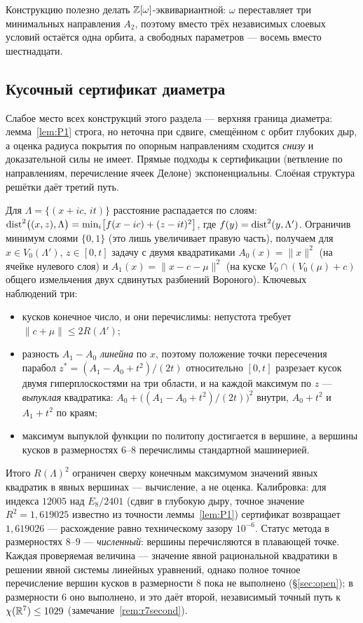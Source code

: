 Конструкцию полезно делать $\mathbb{Z}[\omega]$-эквивариантной: $\omega$ переставляет три
минимальных направления $A_2$, поэтому вместо трёх независимых слоевых условий
остаётся одна орбита, а свободных параметров --- восемь вместо шестнадцати.

\subsection{Кусочный сертификат диаметра}\label{ssec:cert}

Слабое место всех конструкций этого раздела --- верхняя граница диаметра:
лемма~\ref{lem:P1} строга, но неточна при сдвиге, смещённом с орбит глубоких
дыр, а оценка радиуса покрытия по опорным направлениям сходится \emph{снизу}
и доказательной силы не имеет. Прямые подходы к сертификации (ветвление по
направлениям, перечисление ячеек Делоне) экспоненциальны. Слоёная структура
решётки даёт третий путь.

Для $\Lambda=\{(x+ic,\,it)\}$ расстояние распадается по слоям:
$\operatorname{dist}^2\bigl((x,z),\Lambda\bigr)=\min_i\bigl[f(x-ic)+(z-it)^2\bigr]$, где
$f(y)=\operatorname{dist}^2(y,\Lambda')$. Ограничив минимум слоями $\{0,1\}$ (это лишь
увеличивает правую часть), получаем для $x\in V_0(\Lambda')$, $z\in[0,t]$
задачу с двумя квадратиками $A_0(x)=\|x\|^2$ (на ячейке нулевого слоя) и
$A_1(x)=\|x-c-\mu\|^2$ (на куске $V_0\cap(V_0(\mu)+c)$ общего измельчения двух
сдвинутых разбиений Вороного). Ключевых наблюдений три:

\begin{itemize}[leftmargin=1.4em,itemsep=1pt]
\item кусков конечное число, и они перечислимы: непустота требует
$\|c+\mu\|\le2R(\Lambda')$;
\item разность $A_1-A_0$ \emph{линейна} по $x$, поэтому положение точки
пересечения парабол $z^*=(A_1-A_0+t^2)/(2t)$ относительно $[0,t]$ разрезает
кусок двумя гиперплоскостями на три области, и на каждой максимум по $z$ ---
\emph{выпуклая} квадратика: $A_0+\bigl((A_1-A_0+t^2)/(2t)\bigr)^2$ внутри,
$A_0+t^2$ и $A_1+t^2$ по краям;
\item максимум выпуклой функции по политопу достигается в вершине, а вершины
кусков в размерностях $6$--$8$ перечислимы стандартной машинерией.
\end{itemize}

Итого $R(\Lambda)^2$ ограничен сверху конечным максимумом значений явных
квадратик в явных вершинах --- вычисление, а не оценка. Калибровка: для
индекса $12005$ над $E_8/2401$ (сдвиг в глубокую дыру, точное значение
$R^2=1{,}619025$ известно из точности леммы~\ref{lem:P1}) сертификат
возвращает $1{,}619026$ --- расхождение равно техническому зазору $10^{-6}$.
Статус метода в размерностях $8$--$9$ --- \emph{численный}: вершины
перечисляются в плавающей точке. Каждая проверяемая величина --- значение
явной рациональной квадратики в решении явной системы линейных уравнений,
однако полное точное перечисление вершин кусков в размерности $8$ пока не
выполнено (\S\ref{sec:open}); в размерности $6$ оно выполнено, и это даёт
второй, независимый точный путь к $\chi(\mathbb{R}^7)\le1029$
(замечание~\ref{rem:r7second}).


